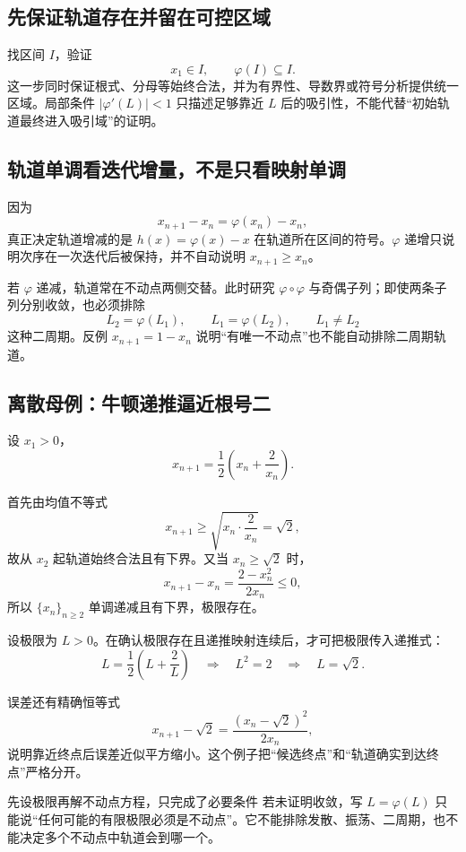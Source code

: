 \documentclass[11pt,a4paper]{ctexart}
\begin{document}
\subsection{先保证轨道存在并留在可控区域}

找区间 $I$，验证
\[
x_1\in I,\qquad \varphi(I)\subseteq I.
\]
这一步同时保证根式、分母等始终合法，并为有界性、导数界或符号分析提供统一区域。局部条件 $\lvert\varphi'(L)\rvert<1$ 只描述足够靠近 $L$ 后的吸引性，不能代替“初始轨道最终进入吸引域”的证明。

\subsection{轨道单调看迭代增量，不是只看映射单调}

因为
\[
x_{n+1}-x_n=\varphi(x_n)-x_n,
\]
真正决定轨道增减的是 $h(x)=\varphi(x)-x$ 在轨道所在区间的符号。$\varphi$ 递增只说明次序在一次迭代后被保持，并不自动说明 $x_{n+1}\ge x_n$。

若 $\varphi$ 递减，轨道常在不动点两侧交替。此时研究 $\varphi\circ\varphi$ 与奇偶子列；即使两条子列分别收敛，也必须排除
\[
L_2=\varphi(L_1),\qquad L_1=\varphi(L_2),\qquad L_1\ne L_2
\]
这种二周期。反例 $x_{n+1}=1-x_n$ 说明“有唯一不动点”也不能自动排除二周期轨道。

\subsection{离散母例：牛顿递推逼近根号二}

设 $x_1>0$，
\[
x_{n+1}=\frac12\left(x_n+\frac2{x_n}\right).
\]

首先由均值不等式
\[
x_{n+1}\ge\sqrt{x_n\cdot\frac2{x_n}}=\sqrt2,
\]
故从 $x_2$ 起轨道始终合法且有下界。又当 $x_n\ge\sqrt2$ 时，
\[
x_{n+1}-x_n=\frac{2-x_n^2}{2x_n}\le0,
\]
所以 $\{x_n\}_{n\ge2}$ 单调递减且有下界，极限存在。

设极限为 $L>0$。在确认极限存在且递推映射连续后，才可把极限传入递推式：
\[
L=\frac12\left(L+\frac2L\right)
\quad\Longrightarrow\quad L^2=2
\quad\Longrightarrow\quad L=\sqrt2.
\]

误差还有精确恒等式
\[
x_{n+1}-\sqrt2
=\frac{{(x_n-\sqrt2)}^2}{2x_n},
\]
说明靠近终点后误差近似平方缩小。这个例子把“候选终点”和“轨道确实到达终点”严格分开。

\begin{warnbox}{先设极限再解不动点方程，只完成了必要条件}
若未证明收敛，写 $L=\varphi(L)$ 只能说“任何可能的有限极限必须是不动点”。它不能排除发散、振荡、二周期，也不能决定多个不动点中轨道会到哪一个。
\end{warnbox}
\end{document}
